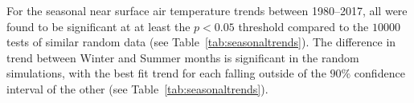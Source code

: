 \documentclass[11pt]{report}
\begin{document}
For the seasonal near surface air temperature trends between 1980--2017, all were found to be significant at at least the $p < 0.05$ threshold compared to the $10000$ tests of similar random data (see Table~\ref{tab:seasonaltrends}). The difference in trend between Winter and Summer months is significant in the random simulations, with the best fit trend for each falling outside of the $90\%$ confidence interval of the other (see Table~\ref{tab:seasonaltrends}).

\end{document}
